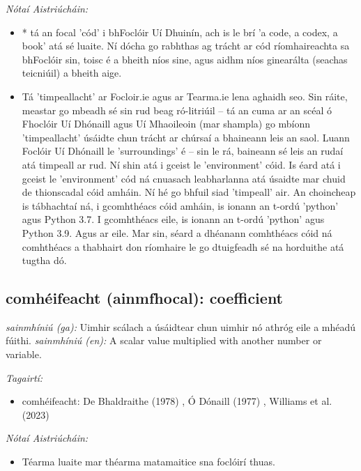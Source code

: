 \documentclass{article}
\begin{document}
 \noindent \textit{Nótaí Aistriúcháin:}
\begin{itemize}
	\item * tá an focal 'cód' i bhFoclóir Uí Dhuinín, ach is le brí 'a code, a codex, a book' atá sé luaite. Ní dócha go rabhthas ag trácht ar cód ríomhaireachta sa bhFoclóir sin, toisc é a bheith níos sine, agus aidhm níos ginearálta (seachas teicniúil) a bheith aige.
	\item Tá 'timpeallacht' ar Focloir.ie agus ar Tearma.ie lena aghaidh seo. Sin ráite, meastar go mbeadh sé sin rud beag ró-litriúil -- tá an cuma ar an scéal ó Fhoclóir Uí Dhónaill agus Uí Mhaoileoin (mar shampla) go mbíonn 'timpeallacht' úsáidte chun trácht ar chúrsaí a bhaineann leis an saol. Luann Foclóir Uí Dhónaill le 'surroundings' é -- sin le rá, baineann sé leis an rudaí atá timpeall ar rud. Ní shin atá i gceist le 'environment' cóid. Is éard atá i gceist le 'environment' cód ná cnuasach leabharlanna atá úsaidte mar chuid de thionscadal cóid amháin. Ní hé go bhfuil siad 'timpeall' air. An choincheap is tábhachtaí ná, i gcomhthéacs cóid amháin, is ionann an t-ordú 'python' agus Python 3.7. I gcomhthéacs eile, is ionann an t-ordú 'python' agus Python 3.9. Agus ar eile. Mar sin, séard a dhéanann comhthéacs cóid ná comhthéacs a thabhairt don ríomhaire le go dtuigfeadh sé na horduithe atá tugtha dó.
\end{itemize}


\subsection*{comhéifeacht (ainmfhocal): coefficient} 
 \noindent \textit{sainmhíniú (ga):} Uimhir scálach a úsáidtear chun uimhir nó athróg eile a mhéadú fúithi.
\newline\newline
 \noindent \textit{sainmhíniú (en):} A scalar value multiplied with another number or variable.
\newline

 \noindent \textit{Tagairtí:}
\begin{itemize}
	\item comhéifeacht: De Bhaldraithe (1978) \cite{de-bhaldraithe}, Ó Dónaill (1977) \cite{odonaill}, Williams et al. (2023) \cite{storchiste}
\end{itemize}

 \noindent \textit{Nótaí Aistriúcháin:}
\begin{itemize}
	\item Téarma luaite mar théarma matamaitice sna foclóirí thuas.
\end{itemize}
\end{document}
